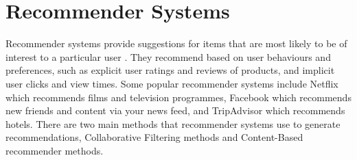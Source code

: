 \begin{table}[]
\setlength\extrarowheight{5pt}
\caption{Recall of Classifiers for different Feature Representations}
\label{Table:recall}
\end{table}





\section{Recommender Systems}
Recommender systems provide suggestions for items that are most likely to be of interest to a particular user \cite{Ricci2015}. They recommend based on user behaviours and preferences, such as explicit user ratings and reviews of products, and implicit user clicks and view times. Some popular recommender systems include Netflix which recommends films and television programmes, Facebook which recommends new friends and content via your news feed, and TripAdvisor which recommends hotels. There are two main methods that recommender systems use to generate recommendations, Collaborative Filtering methods and Content-Based recommender methods. 

